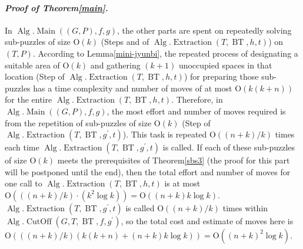 \documentclass[letter,11pt]{article}
\newcommand{\white}{\qquad{\framebox{\rule{0pt}{4pt}}}}
\newcommand{\owari}{\hfill\white}
\theoremstyle{definition}
\theoremstyle{definition}
\DeclareMathOperator{\BT}{BT}
\DeclareMathOperator{\Alg}{Alg}
\DeclareMathOperator{\CutOff}{CutOff}
\DeclareMathOperator{\Extraction}{Extraction}
\DeclareMathOperator{\Main}{Main}
\newcommand{\1}{\boldmath$~1~$\unboldmath}
\newcommand{\Ord}{\mathrm{O}}
\newcommand{\qedgo}{\vspace{0.35cm}}
\newcommand{\tume}{\hspace*{0.2em}}
\newcommand{\maru}[1]{{\ooalign{\hfill$\small#1$\hfill\crcr\scalebox{1.3}{$\bigcirc$}}}}
\newenvironment{Proofof}[1]{\expandafter
\paragraph{{\it Proof of #1.}}}{\hspace{5mm}\owari\qedgo}
\begin{document}
\begin{Proofof}{Theorem\tume\ref{main}}
In $\Alg.\Main((G,P), f, g)$, the other parts are spent on repeatedly solving sub-puzzles of size $\Ord(k)$ (Steps \maru{\ref{mini-puzzle}} and \maru{\ref{mini-puzzle-finish}} of $\Alg.\Extraction(T, \BT,h,t)$) on $(T,P)$.
According to Lemma\tume\ref{mini-jyunbi}, the repeated process of designating a suitable area of $\Ord(k)$ and gathering $(k+1)$ unoccupied spaces in that location 
(Step\tume\maru{\ref{mini-puzzle}} of $\Alg.\Extraction(T, \BT,h,t)$) for preparing those sub-puzzles has a time complexity and number of moves of at most $\Ord(k(k+n))$ for the entire $\Alg.\Extraction(T, \BT,h,t)$.
Therefore, in $\Alg.\Main((G,P), f, g)$, the most effort and number of moves required is from the repetition of sub-puzzles of size $\Ord(k)$ (Step\tume\maru{\ref{mini-puzzle-finish}} of $\Alg.\Extraction(T, \BT,g^{\prime},t)$).
This task is repeated $\Ord((n+k)/k)$ times each time $\Alg.\Extraction(T, \BT,g^{\prime},t)$ is called. If each of these sub-puzzles of size $\Ord(k)$ meets the prerequisites of Theorem\tume\ref{sbs3} (the proof for this part will be postponed until the end), then the total effort and number of moves for one call to $\Alg.\Extraction(T, \BT,h,t)$ is at most $\Ord(((n+k)/k) \cdot (k^2\log k))=\Ord((n+k)k\log k)$. 
$\Alg.\Extraction(T, \BT,g^{\prime},t)$ is called $\Ord((n+k)/k)$ times within $\Alg.\CutOff(G,T,\BT,f,g^{\prime})$, so the total cost and estimate of moves here is $\Ord(((n+k)/k)(k(k+n)+(n+k)k\log k ))=\Ord((n+k)^2\log k )$.


\end{Proofof}
\end{document}
